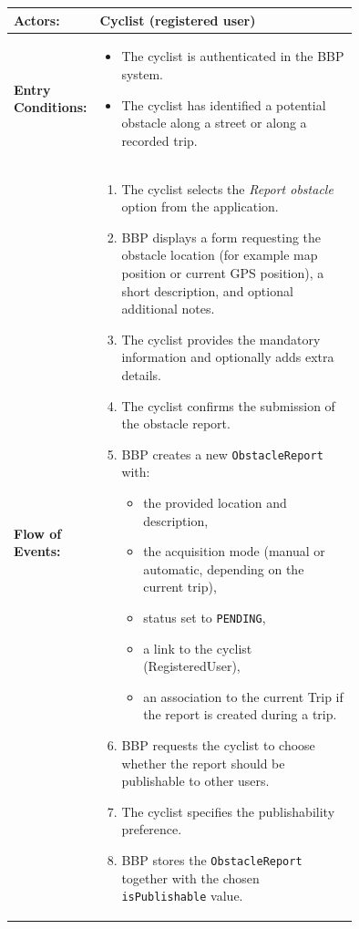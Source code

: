 \begin{center}
\begin{longtable}{|l|p{0.75\linewidth}|}
    \hline
    \textbf{Actors:}           
    & Cyclist (registered user)                                                                      \\
    \hline

    \textbf{Entry Conditions:} 
    & \begin{itemize}
          \item The cyclist is authenticated in the BBP system.
          \item The cyclist has identified a potential obstacle along a street or along a recorded trip.
       \end{itemize}                                                                                 \\
    \hline

    \textbf{Flow of Events:}   
    & \begin{enumerate}
          \item The cyclist selects the \emph{Report obstacle} option from the application.
          \item BBP displays a form requesting the obstacle location (for example map position or current GPS position), a short description, and optional additional notes.
          \item The cyclist provides the mandatory information and optionally adds extra details.
          \item The cyclist confirms the submission of the obstacle report.
          \item BBP creates a new \texttt{ObstacleReport} with:
                \begin{itemize}
                    \item the provided location and description,
                    \item the acquisition mode (manual or automatic, depending on the current trip),
                    \item status set to \texttt{PENDING},
                    \item a link to the cyclist (RegisteredUser),
                    \item an association to the current Trip if the report is created during a trip.
                \end{itemize}
          \item BBP requests the cyclist to choose whether the report should be publishable to other users.
          \item The cyclist specifies the publishability preference.
          \item BBP stores the \texttt{ObstacleReport} together with the chosen \texttt{isPublishable} value.
       \end{enumerate}                                                                                \\
    \hline


\end{longtable}
\end{center}
